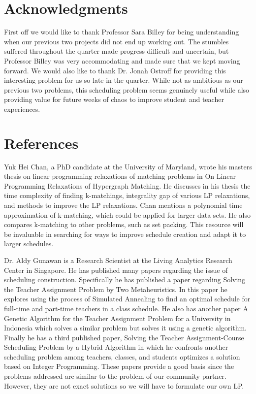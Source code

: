 \documentclass[11pt]{article}
\begin{document}
\section{Acknowledgments}
First off we would like to thank Professor Sara Billey for being understanding when our previous two projects did not end up working out. The stumbles suffered throughout the quarter made progress difficult and uncertain, but Professor Billey was very accommodating and made sure that we kept moving forward. We would also like to thank Dr. Jonah Ostroff for providing this interesting problem for us so late in the quarter. While not as ambitious as our previous two problems, this scheduling problem seems genuinely useful while also providing value for future weeks of chaos to improve student and teacher experiences.

\section{References}
Yuk Hei Chan, a PhD candidate at the University of Maryland, wrote his masters thesis on linear programming relaxations of matching problems in On Linear Programming Relaxations of Hypergraph Matching. He discusses in his thesis the time complexity of finding k-matchings, integrality gap of various LP relaxations, and methods to improve the LP relaxations. Chan mentions a polynomial time approximation of k-matching, which could be applied for larger data sets. He also compares k-matching to other problems, such as set packing. This resource will be invaluable in searching for ways to improve schedule creation and adapt it to larger schedules.

Dr. Aldy Gunawan is a Research Scientist at the Living Analytics Research Center in Singapore. He has published many papers regarding the issue of scheduling construction. Specifically he has published a paper regarding Solving the Teacher Assignment Problem by Two Metaheuristics. In this paper he explores using the process of Simulated Annealing to find an optimal schedule for full-time and part-time teachers in a class schedule. He also has another paper A Genetic Algorithm for the Teacher Assignment Problem for a University in Indonesia which solves a similar problem but solves it using a genetic algorithm. Finally he has a third published paper, Solving the Teacher Assignment-Course Scheduling Problem by a Hybrid Algorithm in which he confronts another scheduling problem among teachers, classes, and students optimizes a solution based on Integer Programming. These papers provide a good basis since the problems addressed are similar to the problem of our community partner. However, they are not exact solutions so we will have to formulate our own LP.
\end{document}
